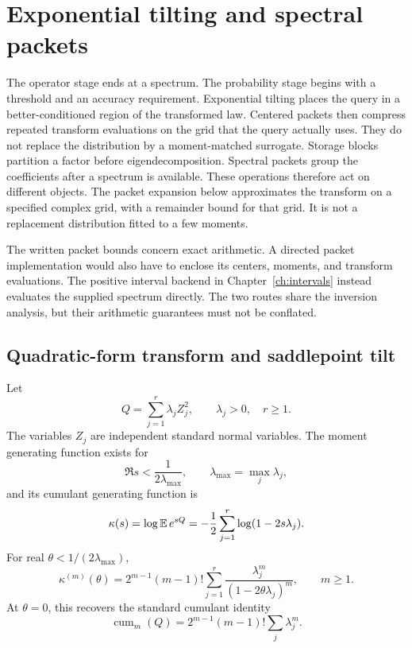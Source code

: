 \chapter{Exponential tilting and spectral packets}\label{ch:packets}
The operator stage ends at a spectrum. The probability stage begins with a
threshold and an accuracy requirement. Exponential tilting places the query
in a better-conditioned region of the transformed law. Centered packets then
compress repeated transform evaluations on the grid that the query actually
uses. They do not replace the distribution by a moment-matched surrogate.
\label{sec:packets}
Storage blocks partition a factor before eigendecomposition. Spectral packets group the coefficients after a spectrum is available. These operations therefore act on different objects. The packet expansion below approximates the transform on a specified complex grid, with a remainder bound for that grid. It is not a replacement distribution fitted to a few moments.

The written packet bounds concern exact arithmetic. A directed packet implementation would also have to enclose its centers, moments, and transform evaluations. The positive interval backend in Chapter~\ref{ch:intervals} instead evaluates the supplied spectrum directly. The two routes share the inversion analysis, but their arithmetic guarantees must not be conflated.

\section{Quadratic-form transform and saddlepoint tilt}

Let
\begin{equation}
Q=\sum_{j=1}^{r}\lambda_j Z_j^2,
\qquad \lambda_j>0,\quad r\ge1.
\label{eq:Q}
\end{equation}
The variables $Z_j$ are independent standard normal variables.
The moment generating function exists for
\[
\Re s < \frac{1}{2\lambda_{\max}},
\qquad
\lambda_{\max}=\max_j\lambda_j,
\]
and its cumulant generating function is
\begin{equation}
\kappa(s)=\log \operatorname{\mathbb E} e^{sQ}
=-\frac12\sum_{j=1}^{r}\log(1-2s\lambda_j).
\label{eq:cgf}
\end{equation}
For real $\theta<1/(2\lambda_{\max})$,
\begin{equation}
\kappa^{(m)}(\theta)
=2^{m-1}(m-1)!\sum_{j=1}^{r}
\frac{\lambda_j^m}{(1-2\theta\lambda_j)^m},
\qquad m\ge1.
\label{eq:derivatives}
\end{equation}
At $\theta=0$, this recovers the standard cumulant identity
\[
\operatorname{cum}_m(Q)=2^{m-1}(m-1)!\sum_j\lambda_j^m.
\]

